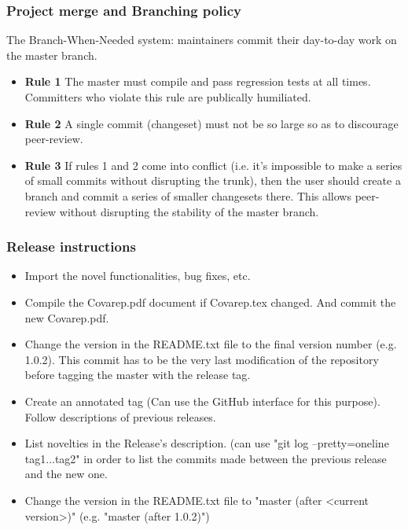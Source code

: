 \documentclass{article}
\begin{document}
    \subsubsection{Project merge and Branching policy}
    The Branch-When-Needed system: maintainers commit their day-to-day work on the master branch.
    \begin{itemize}
    \item[] \textbf{Rule 1} The master must compile and pass regression tests at all times. Committers who violate this rule are publically humiliated.
    \item[] \textbf{Rule 2} A single commit (changeset) must not be so large so as to discourage peer-review.
    \item[] \textbf{Rule 3} If rules 1 and 2 come into conflict (i.e. it's impossible to make a series of small commits without disrupting the trunk), then the user should create a branch and commit a series of smaller changesets there. This allows peer-review without disrupting the stability of the master branch.
    \end{itemize}
    
    \subsubsection{Release instructions}
    \begin{itemize}
    \item Import the novel functionalities, bug fixes, etc.
    \item Compile the Covarep.pdf document if Covarep.tex changed. And commit the new Covarep.pdf.
    \item Change the version in the README.txt file to the final version number (e.g. 1.0.2). This commit has to be the very last modification of the repository before tagging the master with the release tag.
    \item Create an annotated tag (Can use the GitHub interface for this purpose). Follow descriptions of previous releases.
    \item List novelties in the Release's description. (can use "git log --pretty=oneline tag1...tag2" in order to list the commits made between the previous release and the new one.
    \item Change the version in the README.txt file to "master (after <current version>)" (e.g. "master (after 1.0.2)")
    \end{itemize}
    
% 
% 
\end{document}
